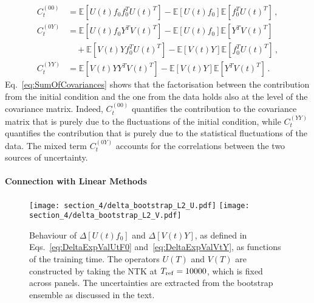 \begin{align}
    \label{eq:C00term}
    C_t^{(00)} 
        &= \mathbb{E}\left[U(t) f_0 f_0^T U(t)^T\right] 
        - \mathbb{E}\left[U(t) f_0\right] \mathbb{E}\left[f_0^T U(t)^T\right]\, ,\\
    C_t^{(0Y)}
        &= \mathbb{E}\left[U(t) f_0 Y^T V(t)^T\right] 
        - \mathbb{E}\left[U(t) f_0\right] \mathbb{E}\left[Y^T V(t)^T\right] \nonumber \\
        \label{eq:C0Yterm}
        &\quad + \mathbb{E}\left[V(t) Y f_0^T U(t)^T\right]
            - \mathbb{E}\left[V(t) Y\right] \mathbb{E}\left[f_0^T U(t)^T\right] \, ,\\
    C_t^{(YY)}
        &= \mathbb{E}\left[V(t) Y Y^T V(t)^T\right]
        - \mathbb{E}\left[V(t) Y\right] \mathbb{E}\left[Y^T V(t)^T\right]\, .
        \label{eq:CYYterm}
\end{align}
Eq.~\eqref{eq:SumOfCovariances} shows that the factorisation between the
contribution from the initial condition and the one from the data holds also at
the level of the covariance matrix. Indeed, $C_t^{(00)}$ quantifies the
contribution to the covariance matrix that is purely due to the fluctuations of
the initial condition, while $C_t^{(YY)}$ quantifies the contribution that is
purely due to the statistical fluctuations of the data. The mixed term
$C_t^{(0Y)}$ accounts for the correlations between the two sources of
uncertainty.


\paragraph{Connection with Linear Methods}
\begin{figure}[t!]
  \centering
  \texttt{[image: section\_4/delta\_bootstrap\_L2\_U.pdf]}
  \texttt{[image: section\_4/delta\_bootstrap\_L2\_V.pdf]}
  \caption{Behaviour of $\Delta [U(t)f_0]$ and $\Delta [V(t)Y]$, as defined in
  Eqs.~\eqref{eq:DeltaExpValUtF0} and~\eqref{eq:DeltaExpValVtY}, as functions
  of the training
  time. The operators $U(T)$ and $V(T)$ are constructed by taking the 
  NTK at $T_{\rm ref} = 10000$, which is fixed across panels. The uncertainties are extracted
  from the bootstrap ensemble as discussed in the text.}
    \label{fig:xT3_exp_val}
\end{figure}

